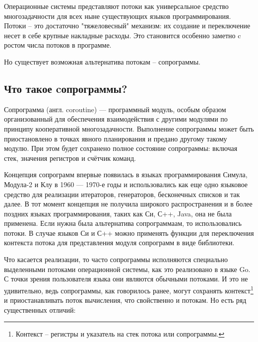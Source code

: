 	\par
	Операционные системы представляют потоки как универсальное средство многозадачности
	для всех ныне существующих языков программирования. Потоки 
	-- это достаточно "тяжеловесный" механизм: их создание и переключение несет в себе крупные накладные расходы. 
	Это становится особенно заметно c ростом числа потоков в программе. 
	\par
	Но существует возможная альтернатива потокам -- сопрограммы.
	\clearpage
	
	\subsection{Что такое cопрограммы?}
	Сопрограмма (англ. coroutine) — программный модуль, особым образом организованный для обеспечения взаимодействия с
	другими модулями по принципу кооперативной многозадачности\cite{coroutine}. Выполнение сопрограммы может быть
	приостановлено в точках явного планирования и предано другому такому модулю. При этом будет сохранено полное
	состояние сопрограммы: включая стек, значения регистров и счётчик команд.
	\par
	Концепция сопрограмм впервые появилась в языках программирования Симула\cite{simula},
	Модула-2\cite{modula} и Клу\cite{clu} в 1960 — 1970-е годы и использовались как еще одно языковое средство для
	реализации итераторов, генераторов, бесконечных списков и так далее. В
	тот момент концепция не получила широкого распространения и в более поздних языках
	программирования, таких как Си, С++, Java, она не была применена. Если нужна была
	альтернатива сопрограммаам, то использовались потоки. В случае языков Си и С++ можно применять функции для
	переключения контекста потока для представления модуля сопрограмм в виде библиотеки.
	\par
	Что касается реализации, то часто сопрограммы исполняются специально выделенными потоками операционной системы,
	как это реализовано в языке Go. С точки зрения пользователя языка они являются обычными потоками.
	И это не удивительно, ведь сопрограммы, как говорилось ранее, могут сохранять контекст\footnote{Контекст -- регистры и указатель на стек потока или сопрограммы.} и приостанавливать поток вычисления, что свойственно и потокам. Но есть ряд существенных отличий:
